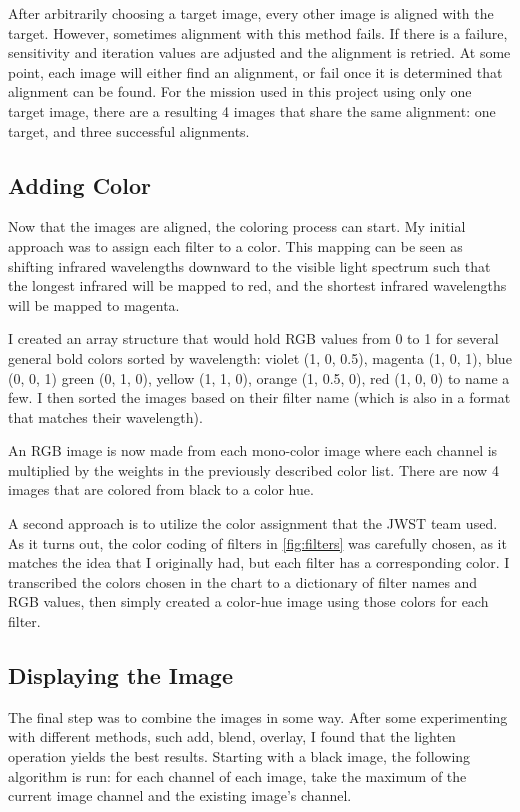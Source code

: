\documentclass[10pt,twocolumn,letterpaper]{article}
\begin{document}
After arbitrarily choosing a target image, every other image is aligned with the target. However, sometimes alignment with this method fails. If there is a failure, sensitivity and iteration values are adjusted and the alignment is retried. At some point, each image will either find an alignment, or fail once it is determined that alignment can be found. For the mission used in this project using only one target image, there are a resulting 4 images that share the same alignment: one target, and three successful alignments.

\subsection{Adding Color}
Now that the images are aligned, the coloring process can start. My initial approach was to assign each filter to a color. This mapping can be seen as shifting infrared wavelengths downward to the visible light spectrum such that the longest infrared will be mapped to red, and the shortest infrared wavelengths will be mapped to magenta.

I created an array structure that would hold RGB values from 0 to 1 for several general bold colors sorted by wavelength: violet (1, 0, 0.5), magenta (1, 0, 1), blue (0, 0, 1) green (0, 1, 0), yellow (1, 1, 0), orange (1, 0.5, 0), red (1, 0, 0) to name a few. I then sorted the images based on their filter name (which is also in a format that matches their wavelength).

An RGB image is now made from each mono-color image where each channel is multiplied by the weights in the previously described color list. There are now 4 images that are colored from black to a color hue.

A second approach is to utilize the color assignment that the JWST team used. As it turns out, the color coding of filters in \cref{fig:filters} was carefully chosen, as it matches the idea that I originally had, but each filter has a corresponding color. I transcribed the colors chosen in the chart to a dictionary of filter names and RGB values, then simply created a color-hue image using those colors for each filter.

\subsection{Displaying the Image}

The final step was to combine the images in some way. After some experimenting with different methods, such add, blend, overlay, I found that the lighten operation yields the best results. Starting with a black image, the following algorithm is run: for each channel of each image, take the maximum of the current image channel and the existing image's channel.
\end{document}
